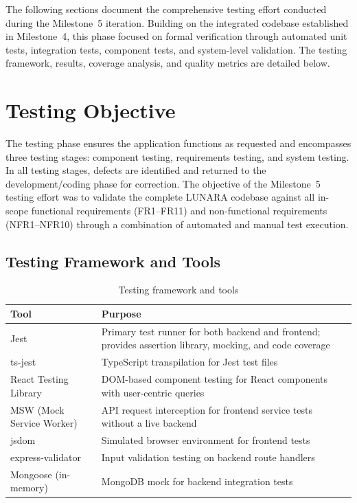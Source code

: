 \documentclass[12pt,letterpaper]{article}
\begin{document}
\vspace{0.75cm}

The following sections document the comprehensive testing effort conducted during the Milestone~5 iteration. Building on the integrated codebase established in Milestone~4, this phase focused on formal verification through automated unit tests, integration tests, component tests, and system-level validation. The testing framework, results, coverage analysis, and quality metrics are detailed below.

\section{Testing Objective}

The testing phase ensures the application functions as requested and encompasses three testing stages: component testing, requirements testing, and system testing. In all testing stages, defects are identified and returned to the development/coding phase for correction. The objective of the Milestone~5 testing effort was to validate the complete LUNARA codebase against all in-scope functional requirements (FR1--FR11) and non-functional requirements (NFR1--NFR10) through a combination of automated and manual test execution.

\subsection{Testing Framework and Tools}

\begin{table}[!htbp]
\centering
\small
\begin{tabularx}{\textwidth}{|l|>{\raggedright\arraybackslash}X|}
\hline
\rowcolor{TableHeader}\textcolor{TableHeaderText}{\textbf{Tool}} & \textcolor{TableHeaderText}{\textbf{Purpose}} \\
\hline
Jest & Primary test runner for both backend and frontend; provides assertion library, mocking, and code coverage \\
\hline
\rowcolor{TableRowAlt}
ts-jest & TypeScript transpilation for Jest test files \\
\hline
React Testing Library & DOM-based component testing for React components with user-centric queries \\
\hline
\rowcolor{TableRowAlt}
MSW (Mock Service Worker) & API request interception for frontend service tests without a live backend \\
\hline
jsdom & Simulated browser environment for frontend tests \\
\hline
\rowcolor{TableRowAlt}
express-validator & Input validation testing on backend route handlers \\
\hline
Mongoose (in-memory) & MongoDB mock for backend integration tests \\
\hline
\end{tabularx}
\caption{Testing framework and tools}
\end{table}
\end{document}
